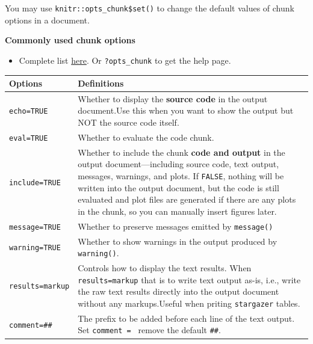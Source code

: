\documentclass[
  a4paper,
  twoside,
  openright]{book}
\providecommand{\tightlist}{%
  \setlength{\itemsep}{0pt}\setlength{\parskip}{0pt}}
\theoremstyle{definition}
\theoremstyle{definition}
\theoremstyle{definition}
\theoremstyle{definition}
\theoremstyle{remark}
\begin{document}
You may use \texttt{knitr::opts\_chunk\$set()} to change the default values of chunk options in a document.

\textbf{Commonly used chunk options}

\begin{itemize}
\tightlist
\item
  Complete list \href{https://yihui.org/knitr/options/}{here}. Or \texttt{?opts\_chunk} to get the help page.
\end{itemize}

\begin{longtable}[]{@{}
  >{\raggedright\arraybackslash}p{}
  >{\raggedright\arraybackslash}p{}@{}}
\toprule\noalign{}
\begin{minipage}[b]{\linewidth}\raggedright
Options
\end{minipage} & \begin{minipage}[b]{\linewidth}\raggedright
Definitions
\end{minipage} \\
\midrule\noalign{}
\endhead
\bottomrule\noalign{}
\endlastfoot
\texttt{echo=TRUE} & Whether to display the \textbf{source code} in the output document.Use this when you want to show the output but NOT the source code itself. \\
\texttt{eval=TRUE} & Whether to evaluate the code chunk. \\
\texttt{include=TRUE} & Whether to include the {chunk \textbf{code and output}} in the output document---including source code, text output, messages, warnings, and plots. If \texttt{FALSE}, nothing will be written into the output document, but the code is still evaluated and plot files are generated if there are any plots in the chunk, so you can manually insert figures later. \\
\texttt{message=TRUE} & Whether to preserve messages emitted by \texttt{message()} \\
\texttt{warning=TRUE} & Whether to show warnings in the output produced by \texttt{warning()}. \\
\texttt{results=\textquotesingle{}markup\textquotesingle{}} & Controls how to display the text results. When \texttt{results=\textquotesingle{}markup\textquotesingle{}} that is to write text output as-is, i.e., write the raw text results directly into the output document without any markups.Useful when priting \texttt{stargazer} tables. \\
\texttt{comment=\textquotesingle{}\#\#\textquotesingle{}} & The prefix to be added before each line of the text output. Set \texttt{comment\ =\ \textquotesingle{}\textquotesingle{}} remove the default \texttt{\#\#}. \\

\end{longtable}
\end{document}
